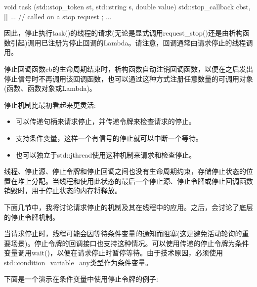 \begin{cpp}
void task (std::stop_token st,
std::string s, double value)
{
	std::stop_callback cb{st, [] {
							   ... // called on a stop request
							  }};
	...
}
\end{cpp}

因此，停止执行task()的线程的请求(无论是显式调用request\_stop()还是由析构函数引起)调用已注册为停止回调的Lambda。请注意，回调通常由请求停止的线程调用。

停止回调函数cb的生命周期结束时，析构函数自动注销回调函数，以便在之后发出停止信号时不再调用该回调函数，也可以通过这种方式注册任意数量的可调用对象(函数、函数对象或Lambda)。

停止机制比最初看起来更灵活:

\begin{itemize}
\item
可以传递句柄来请求停止，并传递令牌来检查请求的停止。

\item
支持条件变量，这样一个有信号的停止就可以中断一个等待。

\item
也可以独立于std::jthread使用这种机制来请求和检查停止。
\end{itemize}

线程、停止源、停止令牌和停止回调之间也没有生命周期约束，存储停止状态的位置在堆上分配。当线程和使用此状态的最后一个停止源、停止令牌或停止回调函数销毁时，用于停止状态的内存将释放。

下面几节中，我将讨论请求停止的机制及其在线程中的应用。之后，会讨论了底层的停止令牌机制。


当请求停止时，线程可能会因等待条件变量的通知而阻塞(这是避免活动轮询的重要场景)。停止令牌的回调接口也支持这种情况。可以使用传递的停止令牌为条件变量调用wait()，以便在请求停止时暂停等待。由于技术原因，必须使用std::condition\_variable\_any类型作为条件变量。

下面是一个演示在条件变量中使用停止令牌的例子:


